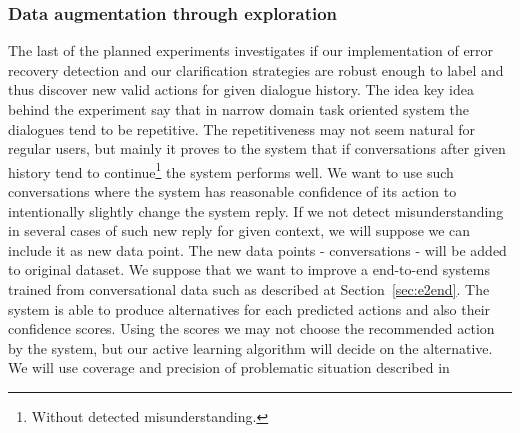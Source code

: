 \documentclass[11pt]{article}
\begin{document}
\subsubsection*{Data augmentation through exploration}
The last of the planned experiments investigates if our implementation of error recovery detection and our clarification strategies are robust enough to label and thus discover new valid actions for given dialogue history.
The idea key idea behind the experiment say that in narrow domain task oriented system the dialogues tend to be repetitive.
The repetitiveness may not seem natural for regular users, but mainly it proves to the system that if conversations after given history tend to continue\footnote{Without detected misunderstanding.} the system performs well.
We want to use such conversations where the system has reasonable confidence of its action to intentionally slightly change the system reply.
If we not detect misunderstanding in several cases of such new reply for given context, we will suppose we can include it as new data point. 
The new data points - conversations - will be added to original dataset.
We suppose that we want to improve a end-to-end systems trained from conversational data such as described at Section~\ref{sec:e2end}.
The system is able to produce alternatives for each predicted actions and also their confidence scores.
Using the scores we may not choose the recommended action by the system, but our active learning algorithm will decide on the alternative.
We will use coverage and precision of problematic situation described in~\cite{meena_data-driven_2016}
\end{document}
